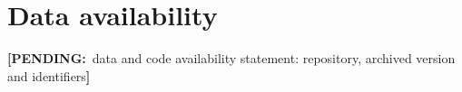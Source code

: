\documentclass[aps,prb,reprint,amsmath,amssymb,superscriptaddress,floatfix,nofootinbib]{revtex4-2}
\newcommand{\PENDING}[1]{{\color{red}\textbf{[PENDING:}~#1\textbf{]}}}
\theoremstyle{plain}
\theoremstyle{definition}
\theoremstyle{remark}
\begin{document}
\maketitle










\section*{Data availability}
\PENDING{data and code availability statement: repository, archived version and identifiers}

\appendix



\end{document}
